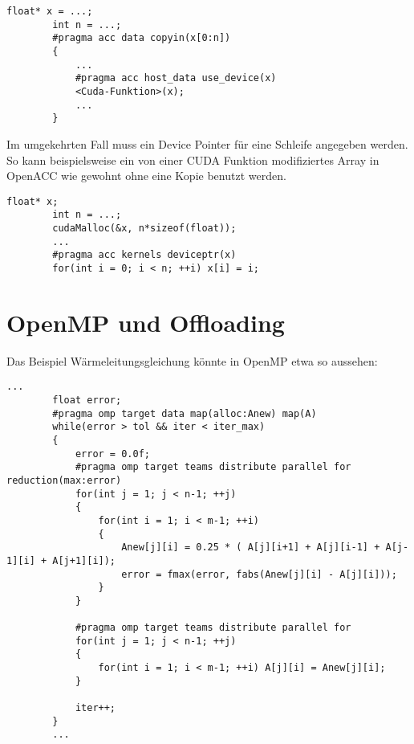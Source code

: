 		\begin{lstlisting}[caption=OpenACC/CUDA Zusammenspiel: Host Memory]
		float* x = ...;
		int n = ...;
		#pragma acc data copyin(x[0:n])
		{
			...
			#pragma acc host_data use_device(x)
			<Cuda-Funktion>(x);
			...
		}
		\end{lstlisting}

		Im umgekehrten Fall muss ein Device Pointer für eine Schleife angegeben werden. So kann beispielsweise ein von einer CUDA Funktion modifiziertes Array in OpenACC wie gewohnt ohne eine Kopie benutzt werden.
		
		\begin{lstlisting}[caption=OpenACC/CUDA Zusammenspiel: Device Memory]
		float* x;
		int n = ...;
		cudaMalloc(&x, n*sizeof(float));
		...
		#pragma acc kernels deviceptr(x)
		for(int i = 0; i < n; ++i) x[i] = i;
		\end{lstlisting}
			
		\newpage
		\section{OpenMP und Offloading}
		Das Beispiel Wärmeleitungsgleichung könnte in OpenMP etwa so aussehen:
		
		\begin{lstlisting}[caption=OpenMP: Offloading]
		...
		float error;
		#pragma omp target data map(alloc:Anew) map(A)
		while(error > tol && iter < iter_max)
		{
			error = 0.0f;
			#pragma omp target teams distribute parallel for reduction(max:error)
			for(int j = 1; j < n-1; ++j)
			{
				for(int i = 1; i < m-1; ++i)
				{
					Anew[j][i] = 0.25 * ( A[j][i+1] + A[j][i-1] + A[j-1][i] + A[j+1][i]);
					error = fmax(error, fabs(Anew[j][i] - A[j][i]));
				}
			}
			
			#pragma omp target teams distribute parallel for
			for(int j = 1; j < n-1; ++j)
			{
				for(int i = 1; i < m-1; ++i) A[j][i] = Anew[j][i];
			}
			
			iter++;
		}
		...
		\end{lstlisting}

